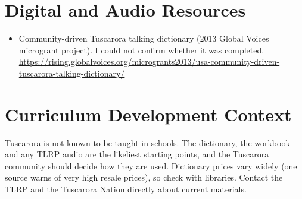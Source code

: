 \documentclass[12pt]{article}
\begin{document}
\section{Digital and Audio Resources}
\begin{itemize}
\item Community-driven Tuscarora talking dictionary (2013 Global Voices microgrant project). I could not confirm whether it was completed. \url{https://rising.globalvoices.org/microgrants2013/usa-community-driven-tuscarora-talking-dictionary/}
\end{itemize}

\section{Curriculum Development Context}
Tuscarora is not known to be taught in schools. The dictionary, the workbook and any TLRP audio are the likeliest starting points, and the Tuscarora community should decide how they are used. Dictionary prices vary widely (one source warns of very high resale prices), so check with libraries. Contact the TLRP and the Tuscarora Nation directly about current materials.
\end{document}
